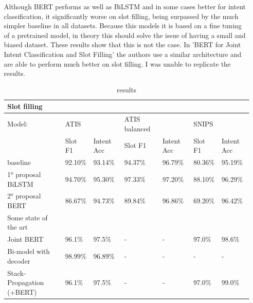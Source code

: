 \documentclass[a4paper]{article}
\begin{document}
Although BERT performs as well as BiLSTM and in some cases better for intent classification, it significantly worse on slot filling, being surpassed by the much simpler baseline in all datasets. Because this models it is based on a fine tuning of a pretrained model, in theory this should solve the issue of having a small and biased dataset. These results show that this is not the case. In 'BERT for Joint Intent Classification and Slot Filling' \cite{https://doi.org/10.48550/arxiv.1902.10909} the authors use a similar architecture and are able to perform much better on slot filling. I was unable to replicate the results.


\begin{table}[h!]
	\centering
	\begin{adjustbox}{max width=\textwidth}
		\begin{tabular}{*{7}{l}}%
			Slot filling & & &\\
			\hline
			Model: & ATIS & & ATIS balanced & & SNIPS &\\
					& Slot F1 & Intent Acc 	& Slot F1 & Intent Acc 	& Slot F1 & Intent Acc \\
			\hline
			baseline & 92.10\% & 93.14\%& 94.37\%& 96.79\%& 80.36\%& 95.19\% \\
			1° proposal BiLSTM & 94.70\%& 95.30\%& 97.33\%& 97.20\%& 88.10\% & 96.29\%\\
			2° proposal BERT& 86.67\%& 94.73\%& 89.84\%& 96.86\%& 69.20\%& 96.42\%\\
			Some state of the art & & & & & & \\
			Joint BERT \cite{https://doi.org/10.48550/arxiv.1902.10909} & 96.1\%& 97.5\%& - & - & 97.0\%& 98.6\%\\
			Bi-model with decoder\cite{wang-etal-2018-bi} & 98.99\% & 96.89\% & - & - & - & - \\
			Stack-Propagation (+BERT) \cite{qin-etal-2019-stack} & 96.1\% & 97.5\% & - & - & 97.0\% & 99.0\% \\
			\hline
		\end{tabular}
	\end{adjustbox}
		\caption{results}
	\label{tab:final_table}
\end{table}

\end{document}
